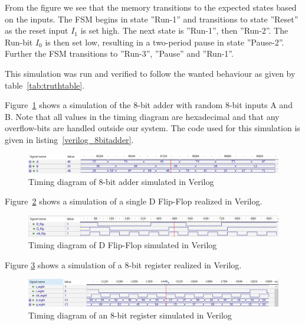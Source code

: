From the figure we see that the memory transitions to the expected states based on the inputs. The FSM begins in state ''Run-1'' and transitions to state ''Reset'' as the reset input $I_1$ is set high. The next state is ''Run-1'', then ''Run-2''. The Run-bit $I_0$ is then set low, resulting in a two-period pause in state ''Pause-2''. Further the FSM transitions to ''Run-3'', ''Pause'' and ''Run-1''.

This simulation was run and verified to follow the wanted behaviour as given by table~\ref{tab:truthtable}.

Figure~\ref{fig:eightbitadder_sim} shows a simulation of the 8-bit adder with random 8-bit inputs A and B. Note that all values in the timing diagram are hexadecimal and that any overflow-bits are handled outside our system. The code used for this simulation is given in listing~\ref{verilog_8bitadder}.

\begin{figure}[H]
    \centering
    \includegraphics[width=\textwidth]{Figures/Test of eightbitadder.png}
    \caption{Timing diagram of 8-bit adder simulated in Verilog}
    \label{fig:eightbitadder_sim}
\end{figure}

Figure~\ref{fig:dflipflop_sim} shows a simulation of a single D Flip-Flop realized in Verilog.

\begin{figure}[H]
    \centering
    \includegraphics[width=\textwidth]{Figures/Test of Dflipflop.png}
    \caption{Timing diagram of D Flip-Flop simulated in Verilog}
    \label{fig:dflipflop_sim}
\end{figure}

Figure \ref{fig:8bitregister_sim} shows a simulation of a 8-bit register realized in Verilog.

\begin{figure}[H]
    \centering
    \includegraphics[width=\textwidth]{Figures/VerilogPlot_8bitreg.png}
    \caption{Timing diagram of an 8-bit register simulated in Verilog}
    \label{fig:8bitregister_sim}
\end{figure}

